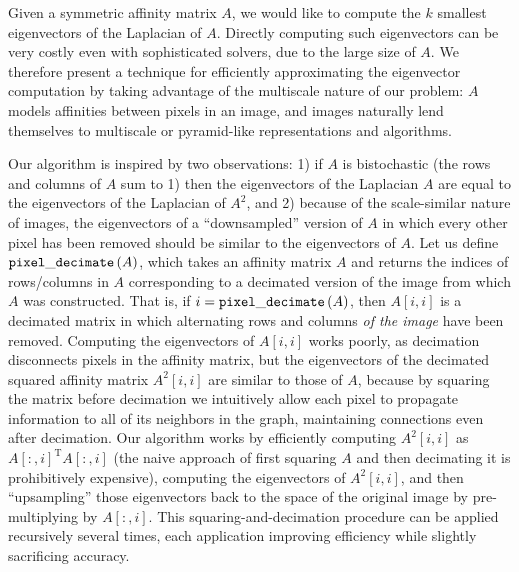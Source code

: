 \documentclass[10pt,journal,cspaper,compsoc]{IEEEtran}
\begin{document}
Given a symmetric affinity matrix $A$, we would like to compute the $k$ smallest eigenvectors of the Laplacian of $A$. 
Directly computing such eigenvectors can be very costly even with sophisticated solvers, due to the large size of $A$. 
We therefore present a technique for efficiently approximating the eigenvector computation by taking advantage of the multiscale nature of our problem: 
$A$ models affinities between pixels in an image, and images naturally lend themselves to multiscale or pyramid-like representations and algorithms.

Our algorithm is inspired by two observations: 1) if $A$ is bistochastic (the rows and columns of $A$ sum to 1) then the eigenvectors of the Laplacian $A$ are equal to the eigenvectors of the Laplacian of $A^2$, and 2) because of the scale-similar nature of images, the eigenvectors of a ``downsampled'' version of $A$ in which every other pixel has been removed should be similar to the eigenvectors of $A$.
Let us define ${\tt pixel\_decimate}\left( A \right)$, which takes an affinity matrix $A$ and returns the indices of rows/columns in $A$ corresponding to a decimated version of the image from which $A$ was constructed.
That is, if $i = {\tt pixel\_decimate}\left( A \right)$, then $A\left[i,i\right]$ is a decimated matrix in which alternating rows and columns \emph{of the image} have been removed.
Computing the eigenvectors of $A\left[i,i\right]$ works poorly, as decimation disconnects pixels in the affinity matrix, but the eigenvectors of the decimated squared affinity matrix $A^2 \left[i,i\right]$ are similar to those of $A$, because by squaring the matrix before decimation we intuitively allow each pixel to propagate information to all of its neighbors in the graph, maintaining connections even after decimation.
Our algorithm works by efficiently computing $A^2 \left[i,i\right]$ as $A\left[:,i\right]^\mathrm{T}A\left[:,i\right]$ (the naive approach of first squaring $A$ and then decimating it is prohibitively expensive), computing the eigenvectors of $A^2 \left[i,i\right]$, and then ``upsampling'' those eigenvectors back to the space of the original image by pre-multiplying by $A\left[:,i\right]$.
This squaring-and-decimation procedure can be applied recursively several times, each application improving efficiency while slightly sacrificing accuracy. 
\end{document}
